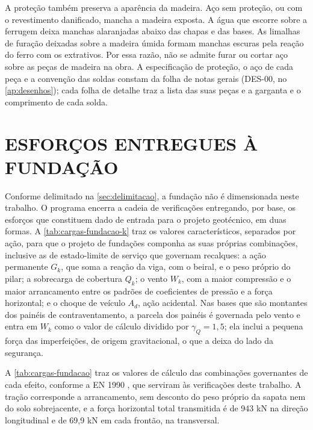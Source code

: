 A proteção também preserva a aparência da madeira. Aço sem proteção, ou com o
revestimento danificado, mancha a madeira exposta. A água que escorre sobre a
ferrugem deixa manchas alaranjadas abaixo das chapas e das bases. As limalhas
de furação deixadas sobre a madeira úmida formam manchas escuras pela reação do
ferro com os extrativos. Por essa razão, não se admite furar ou cortar aço sobre
as peças de madeira na obra. A especificação de proteção, o aço de cada peça e a
convenção das soldas constam da folha de notas gerais (DES-00, no
\autoref{ap:desenhos}); cada folha de detalhe traz a lista das suas peças e a
garganta e o comprimento de cada solda.

\section{ESFORÇOS ENTREGUES À FUNDAÇÃO}\label{sec:cargas-fundacao}

Conforme delimitado na \autoref{sec:delimitacao}, a fundação não é dimensionada
neste trabalho. O programa encerra a cadeia de verificações entregando, por
base, os esforços que constituem dado de entrada para o projeto geotécnico, em
duas formas. A \autoref{tab:cargas-fundacao-k} traz os valores característicos,
separados por ação, para que o projeto de fundações componha as suas próprias
combinações, inclusive as de estado-limite de serviço que governam recalques:
a ação permanente $G_k$, que soma a reação da viga, com o beiral, e o peso
próprio do pilar; a sobrecarga de cobertura $Q_k$; o vento $W_k$, com a maior
compressão e o maior arrancamento entre os padrões de coeficientes de pressão e a
força horizontal; e o choque de veículo $A_d$, ação acidental. Nas bases que são
montantes dos painéis de contraventamento, a parcela dos painéis é governada pelo
vento e entra em $W_k$ como o valor de cálculo dividido por $\gamma_Q = 1{,}5$;
ela inclui a pequena força das imperfeições, de origem gravitacional, o que a
deixa do lado da segurança.



A \autoref{tab:cargas-fundacao} traz os valores de cálculo das combinações
governantes de cada efeito, conforme a EN 1990 \cite{EN1990:2002}, que serviram às
verificações deste trabalho. A tração corresponde a arrancamento, sem desconto do
peso próprio da sapata nem do solo sobrejacente, e a força horizontal total
transmitida é de 943 kN na direção longitudinal e de 69,9 kN em cada frontão, na
transversal.



